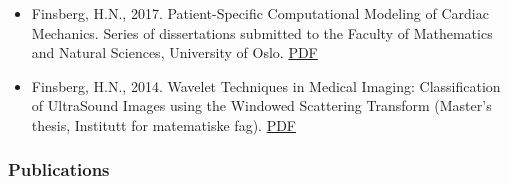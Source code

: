 \documentclass[11pt, a4paper]{article}
\begin{document}
\begin{raggedright}
\begin{itemize}
\item
  Finsberg, H.N., 2017. Patient-Specific Computational Modeling of
  Cardiac Mechanics. Series of dissertations submitted to the Faculty of
  Mathematics and Natural Sciences, University of Oslo.
  \href{https://www.duo.uio.no/bitstream/handle/10852/62015/PhD-Finsberg-2018.pdf}{PDF}
\item
  Finsberg, H.N., 2014. Wavelet Techniques in Medical Imaging:
  Classification of UltraSound Images using the Windowed Scattering
  Transform (Master's thesis, Institutt for matematiske fag).
  \href{https://brage.bibsys.no/xmlui/bitstream/handle/11250/259333/733307_FULLTEXT01.pdf}{PDF}
\end{itemize}

\hypertarget{publications}{%
\subsubsection{Publications}\label{publications}}


\end{raggedright}
\end{document}
